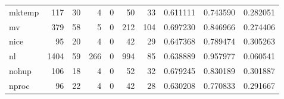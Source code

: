 \begin{tabular}{lrrrrrrrrr}
mktemp    &                                                117 &                                                 30 &                                                  4 &                                                  0 &                                                 50 &                                                 33 &                                           0.611111 &                               0.743590 &                             0.282051 \\
mv        &                                                379 &                                                 58 &                                                  5 &                                                  0 &                                                212 &                                                104 &                                           0.697230 &                               0.846966 &                             0.274406 \\
nice      &                                                 95 &                                                 20 &                                                  4 &                                                  0 &                                                 42 &                                                 29 &                                           0.647368 &                               0.789474 &                             0.305263 \\
nl        &                                               1404 &                                                 59 &                                                266 &                                                  0 &                                                994 &                                                 85 &                                           0.638889 &                               0.957977 &                             0.060541 \\
nohup     &                                                106 &                                                 18 &                                                  4 &                                                  0 &                                                 52 &                                                 32 &                                           0.679245 &                               0.830189 &                             0.301887 \\
nproc     &                                                 96 &                                                 22 &                                                  4 &                                                  0 &                                                 42 &                                                 28 &                                           0.630208 &                               0.770833 &                             0.291667 \\

\end{tabular}
